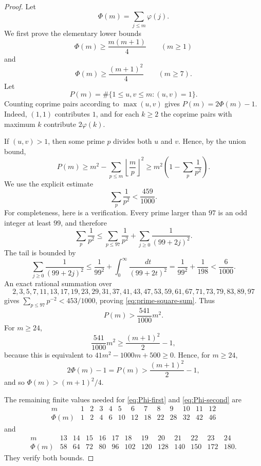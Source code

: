 \documentclass[11pt]{article}
\numberwithin{equation}{section}
\theoremstyle{definition}
\theoremstyle{remark}
\newcommand{\1}{\mathbf 1}
\begin{document}
\begin{proof}
Let
\[
  \Phi(m)=\sum_{j\le m}\varphi(j).
\]
We first prove the elementary lower bounds
\begin{equation}\label{eq:Phi-first}
  \Phi(m)\ge \frac{m(m+1)}4\qquad(m\ge1)
\end{equation}
and
\begin{equation}\label{eq:Phi-second}
  \Phi(m)\ge \frac{(m+1)^2}{4}\qquad(m\ge7).
\end{equation}
Let
\[
  P(m)=\#\{1\le u,v\le m:(u,v)=1\}.
\]
Counting coprime pairs according to $\max(u,v)$ gives $P(m)=2\Phi(m)-1$.  Indeed, $(1,1)$ contributes $1$, and for each $k\ge2$ the coprime pairs with maximum $k$ contribute $2\varphi(k)$.

If $(u,v)>1$, then some prime $p$ divides both $u$ and $v$.  Hence, by the union bound,
\[
  P(m)\ge m^2-\sum_{p\le m}\left\lfloor\frac mp\right\rfloor^2
        \ge m^2\left(1-\sum_p\frac1{p^2}\right).
\]
We use the explicit estimate
\begin{equation}\label{eq:prime-square-sum}
  \sum_p\frac1{p^2}<\frac{459}{1000}.
\end{equation}
For completeness, here is a verification.  Every prime larger than $97$ is an odd integer at least $99$, and therefore
\[
\sum_p\frac1{p^2}
\le \sum_{p\le97}\frac1{p^2}
   +\sum_{j\ge0}\frac1{(99+2j)^2}.
\]
The tail is bounded by
\[
\sum_{j\ge0}\frac1{(99+2j)^2}
\le \frac1{99^2}+\int_0^\infty\frac{dt}{(99+2t)^2}
=\frac1{99^2}+\frac1{198}<\frac6{1000}.
\]
An exact rational summation over
\[
2,3,5,7,11,13,17,19,23,29,31,37,41,43,47,53,59,61,67,71,73,79,83,89,97
\]
gives $\sum_{p\le97}p^{-2}<453/1000$, proving \eqref{eq:prime-square-sum}.  Thus
\[
  P(m)>\frac{541}{1000}m^2.
\]
For $m\ge24$,
\[
  \frac{541}{1000}m^2\ge\frac{(m+1)^2}{2}-1,
\]
because this is equivalent to $41m^2-1000m+500\ge0$.  Hence, for $m\ge24$,
\[
  2\Phi(m)-1=P(m)>\frac{(m+1)^2}{2}-1,
\]
and so $\Phi(m)>(m+1)^2/4$.

The remaining finite values needed for \eqref{eq:Phi-first} and \eqref{eq:Phi-second} are
\[
\begin{array}{c|rrrrrrrrrrrr}
 m&1&2&3&4&5&6&7&8&9&10&11&12\\ \hline
 \Phi(m)&1&2&4&6&10&12&18&22&28&32&42&46
\end{array}
\]
and
\[
\begin{array}{c|rrrrrrrrrrrr}
 m&13&14&15&16&17&18&19&20&21&22&23&24\\ \hline
 \Phi(m)&58&64&72&80&96&102&120&128&140&150&172&180.
\end{array}
\]
They verify both bounds.


\end{proof}
\end{document}
